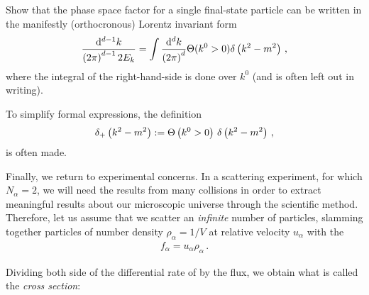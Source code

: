 \begin{exercise}
    \label{ex:lorentz-invariant-phase-space}

    Show that the phase space factor for a single final-state particle can be written in the manifestly (orthocronous) Lorentz invariant form
    \begin{align}
        \frac{\dd^{d-1} k}{\left(2\pi\right)^{d-1} 2 E_k}
        =
        \int
        \frac{\dd^d k}{\left(2\pi\right)^d}
        \Theta(k^0 > 0) \delta\left(k^2 - m^2\right)
        \,,
    \end{align}
    where the integral of the right-hand-side is done over \(k^0\) (and is often left out in writing).

    To simplify formal expressions, the definition
    \begin{align}
        \delta_+\left(k^2 - m^2\right)
        :=
        \Theta\left(k^0 > 0\right)\,\delta\left(k^2 - m^2\right)
        \,,
    \end{align}
    is often made.
\end{exercise}


Finally, we return to experimental concerns.
%
In a scattering experiment, for which \(N_\alpha = 2\), we will need the results from many collisions in order to extract meaningful results about our microscopic universe through the scientific method.
%
Therefore, let us assume that we scatter an \textit{infinite} number of particles, slamming together particles of number density \(\rho_\alpha = 1/V\) at relative velocity \(u_{\alpha}\) with the 
\begin{align}
    f_\alpha = u_\alpha \rho_\alpha
    \,.
\end{align}

Dividing both side of the differential rate of  by the flux, we obtain what is called the \textit{cross section}:

